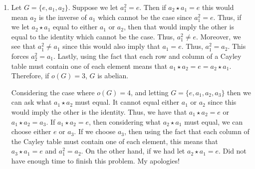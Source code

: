 \documentclass[12pt]{article}
\makeatletter
\theoremstyle{definition}
\theoremstyle{remark}
\renewenvironment{proof}[1][\proofname]{\par
  \pushQED{\qed}%
  \normalfont \topsep6\p@\@plus6\p@\relax
  \list{}{\leftmargin=0mm
          \rightmargin=4mm
          \settowidth{\itemindent}{\itshape#1}%
          \labelwidth=\itemindent
          \parsep=0pt \listparindent=\parindent 
  }
  \item[\hskip\labelsep
        \itshape
    #1\@addpunct{.}]\ignorespaces
}{%
  \popQED\endlist\@endpefalse
}
\let\oldproofname=\proofname
\renewcommand{\proofname}{\bf{\textit{\oldproofname}}}
\makeatother
\begin{document}
\begin{enumerate}[leftmargin=*]
\begin{proof}
    Let $G=\{e,a_1,a_2\}$. Suppose we let $a_1^2=e$. Then if $a_2\star a_1=e$ this would mean $a_2$ is the inverse of $a_1$ which cannot be the case since $a_1^2=e$. Thus, if we let $a_2\star a_1$ equal to either $a_1$ or $a_2$, then that would imply the other is equal to the identity which cannot be the case. Thus, $a_1^2\neq e$. Moreover, we see that $a_1^2\neq a_1$ since this would also imply that $a_1=e$. Thus, $a_1^2=a_2$. This forces $a_2^2=a_1$. Lastly, using the fact that each row and column of a Cayley table must contain one of each element means that $a_1\star a_2=e=a_2\star a_1$. Therefore, if $o(G)=3$, $G$ is abelian.\par\hspace{4mm} Considering the case where $o(G)=4$, and letting $G=\{e,a_1,a_2,a_3\}$ then we can ask what $a_1\star a_2$ must equal. It cannot equal either $a_1$ or $a_2$ since this would imply the other is the identity. Thus, we have that $a_1\star a_2=e$ or $a_1\star a_2=a_3$. If $a_1\star a_2=e$, then considering what $a_2\star a_1$ must equal, we can choose either $e$ or $a_3$. If we choose $a_3$, then using the fact that each column of the Cayley table must contain one of each element, this means that $a_3\star a_1=e$ and $a_1^2=a_2$. On the other hand, if we had let $a_2\star a_1=e$. Did not have enough time to finish this problem. My apologies!
\end{proof}

\end{enumerate}
\end{document}
